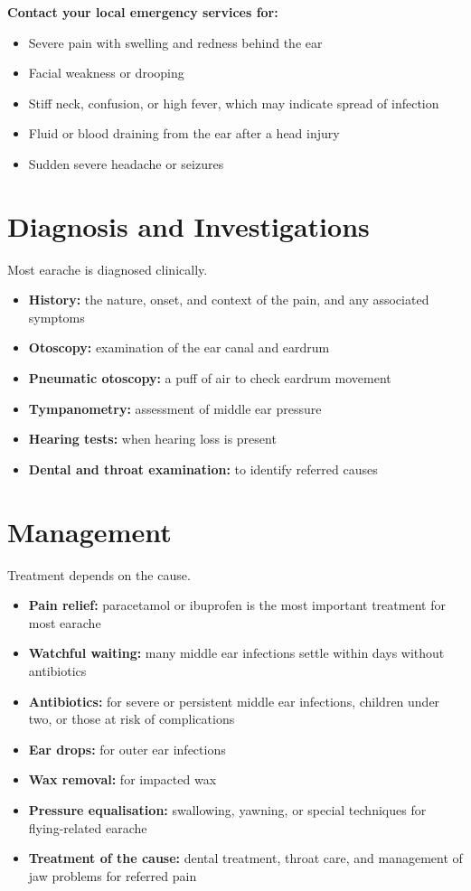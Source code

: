 \textbf{Contact your local emergency services for:}
\begin{itemize}
    \item Severe pain with swelling and redness behind the ear
    \item Facial weakness or drooping
    \item Stiff neck, confusion, or high fever, which may indicate spread of infection
    \item Fluid or blood draining from the ear after a head injury
    \item Sudden severe headache or seizures
\end{itemize}

\section*{Diagnosis and Investigations}
Most earache is diagnosed clinically.
\begin{itemize}
    \item \textbf{History:} the nature, onset, and context of the pain, and any associated symptoms
    \item \textbf{Otoscopy:} examination of the ear canal and eardrum
    \item \textbf{Pneumatic otoscopy:} a puff of air to check eardrum movement
    \item \textbf{Tympanometry:} assessment of middle ear pressure
    \item \textbf{Hearing tests:} when hearing loss is present
    \item \textbf{Dental and throat examination:} to identify referred causes
\end{itemize}

\section*{Management}
Treatment depends on the cause.
\begin{itemize}
    \item \textbf{Pain relief:} paracetamol or ibuprofen is the most important treatment for most earache
    \item \textbf{Watchful waiting:} many middle ear infections settle within days without antibiotics
    \item \textbf{Antibiotics:} for severe or persistent middle ear infections, children under two, or those at risk of complications
    \item \textbf{Ear drops:} for outer ear infections
    \item \textbf{Wax removal:} for impacted wax
    \item \textbf{Pressure equalisation:} swallowing, yawning, or special techniques for flying-related earache
    \item \textbf{Treatment of the cause:} dental treatment, throat care, and management of jaw problems for referred pain
\end{itemize}


